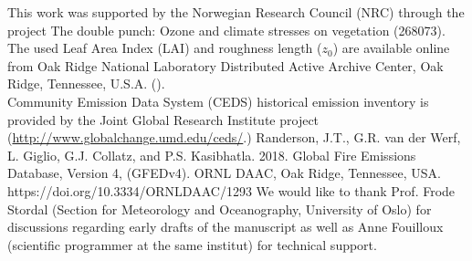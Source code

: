 \documentclass[gmd, manuscript]{copernicus}
\begin{document}








\begin{acknowledgements}
  This work was supported by the Norwegian Research Council (NRC) through the project The double punch: Ozone and climate stresses on vegetation (268073).\\
  The used Leaf Area Index (LAI) and roughness length ($z_0$) are available online from Oak Ridge National Laboratory Distributed Active Archive Center, Oak Ridge, Tennessee, U.S.A. ().\\
  Community Emission Data System (CEDS) historical emission inventory is provided by the Joint Global Research Institute project (\url{http://www.globalchange.umd.edu/ceds/}.)
  Randerson, J.T., G.R. van der Werf, L. Giglio, G.J. Collatz, and P.S. Kasibhatla. 2018. Global Fire Emissions Database, Version 4, (GFEDv4). ORNL DAAC, Oak Ridge, Tennessee, USA. https://doi.org/10.3334/ORNLDAAC/1293
  We would like to thank Prof. Frode Stordal (Section for Meteorology and Oceanography, University of Oslo) for discussions regarding early drafts of the manuscript as well as Anne Fouilloux (scientific programmer at the same institut) for technical support.
\end{acknowledgements}
\end{document}

